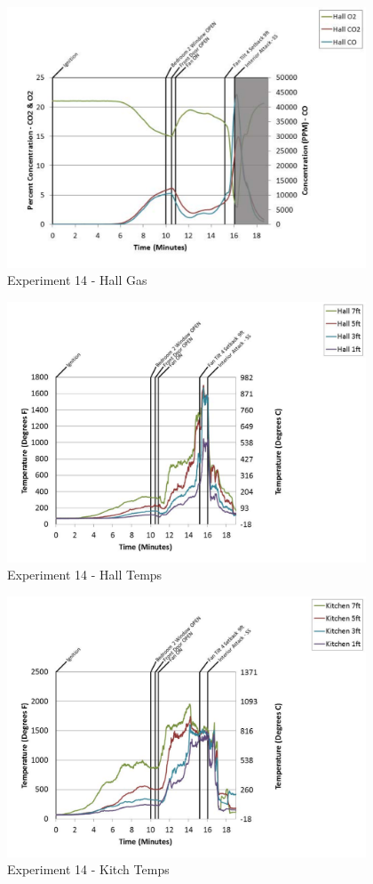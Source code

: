 \documentclass{article}
\begin{document}
\begin{appendices}
	\begin{figure}[h!]
		\centering
		\includegraphics[height=3.05in]{0_Images/Results_Charts/Exp_14_Charts/HallGas.pdf}
		\caption{Experiment 14 - Hall Gas}
	\end{figure}
 
	\clearpage

	\begin{figure}[h!]
		\centering
		\includegraphics[height=3.05in]{0_Images/Results_Charts/Exp_14_Charts/HallTemps.pdf}
		\caption{Experiment 14 - Hall Temps}
	\end{figure}
 

	\begin{figure}[h!]
		\centering
		\includegraphics[height=3.05in]{0_Images/Results_Charts/Exp_14_Charts/KitchTemps.pdf}
		\caption{Experiment 14 - Kitch Temps}
	\end{figure}
 

\end{appendices}
\end{document}

